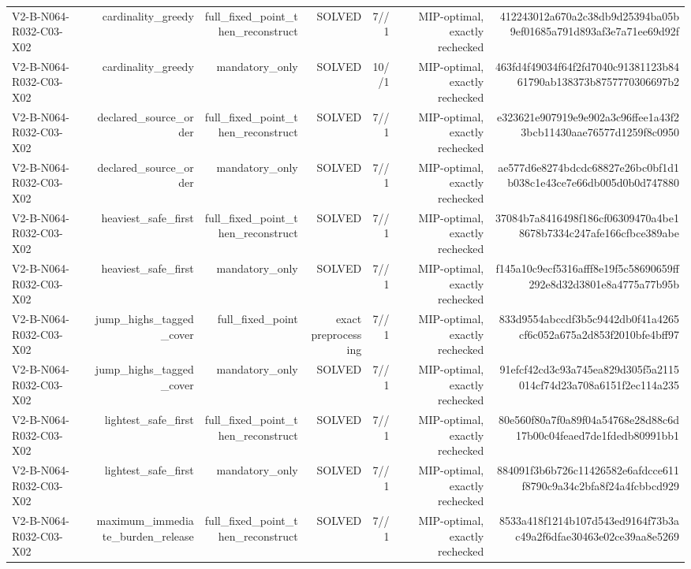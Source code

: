 {\begin{longtable}{lrrrrrr}
V2-B-N064-R032-C03-X02 & cardinality\_greedy & full\_fixed\_point\_then\_reconstruct & SOLVED & 7//1 & MIP-optimal, exactly rechecked & 412243012a670a2c38db9d25394ba05b9ef01685a791d893af3e7a71ee69d92f \\
V2-B-N064-R032-C03-X02 & cardinality\_greedy & mandatory\_only & SOLVED & 10//1 & MIP-optimal, exactly rechecked & 463fd4f49034f64f2fd7040c91381123b8461790ab138373b8757770306697b2 \\
V2-B-N064-R032-C03-X02 & declared\_source\_order & full\_fixed\_point\_then\_reconstruct & SOLVED & 7//1 & MIP-optimal, exactly rechecked & e323621e907919e9e902a3c96ffee1a43f23bcb11430aae76577d1259f8c0950 \\
V2-B-N064-R032-C03-X02 & declared\_source\_order & mandatory\_only & SOLVED & 7//1 & MIP-optimal, exactly rechecked & ae577d6e8274bdcdc68827e26bc0bf1d1b038c1e43ce7e66db005d0b0d747880 \\
V2-B-N064-R032-C03-X02 & heaviest\_safe\_first & full\_fixed\_point\_then\_reconstruct & SOLVED & 7//1 & MIP-optimal, exactly rechecked & 37084b7a8416498f186cf06309470a4be18678b7334c247afe166cfbce389abe \\
V2-B-N064-R032-C03-X02 & heaviest\_safe\_first & mandatory\_only & SOLVED & 7//1 & MIP-optimal, exactly rechecked & f145a10c9ecf5316afff8e19f5c58690659ff292e8d32d3801e8a4775a77b95b \\
V2-B-N064-R032-C03-X02 & jump\_highs\_tagged\_cover & full\_fixed\_point & exact preprocessing & 7//1 & MIP-optimal, exactly rechecked & 833d9554abccdf3b5c9442db0f41a4265cf6c052a675a2d853f2010bfe4bff97 \\
V2-B-N064-R032-C03-X02 & jump\_highs\_tagged\_cover & mandatory\_only & SOLVED & 7//1 & MIP-optimal, exactly rechecked & 91efcf42cd3c93a745ea829d305f5a2115014cf74d23a708a6151f2ec114a235 \\
V2-B-N064-R032-C03-X02 & lightest\_safe\_first & full\_fixed\_point\_then\_reconstruct & SOLVED & 7//1 & MIP-optimal, exactly rechecked & 80e560f80a7f0a89f04a54768e28d88c6d17b00c04feaed7de1fdedb80991bb1 \\
V2-B-N064-R032-C03-X02 & lightest\_safe\_first & mandatory\_only & SOLVED & 7//1 & MIP-optimal, exactly rechecked & 884091f3b6b726c11426582e6afdcce611f8790c9a34c2bfa8f24a4fcbbcd929 \\
V2-B-N064-R032-C03-X02 & maximum\_immediate\_burden\_release & full\_fixed\_point\_then\_reconstruct & SOLVED & 7//1 & MIP-optimal, exactly rechecked & 8533a418f1214b107d543ed9164f73b3ac49a2f6dfae30463e02ce39aa8e5269 \\

\end{longtable}}
